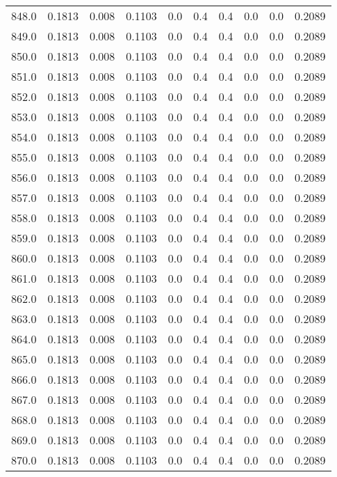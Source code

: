 \begin{longtable}{lrrrrrrrrr}
848.0 & 0.1813 & 0.008 & 0.1103 & 0.0 & 0.4 & 0.4 & 0.0 & 0.0 & 0.2089 \\
849.0 & 0.1813 & 0.008 & 0.1103 & 0.0 & 0.4 & 0.4 & 0.0 & 0.0 & 0.2089 \\
850.0 & 0.1813 & 0.008 & 0.1103 & 0.0 & 0.4 & 0.4 & 0.0 & 0.0 & 0.2089 \\
851.0 & 0.1813 & 0.008 & 0.1103 & 0.0 & 0.4 & 0.4 & 0.0 & 0.0 & 0.2089 \\
852.0 & 0.1813 & 0.008 & 0.1103 & 0.0 & 0.4 & 0.4 & 0.0 & 0.0 & 0.2089 \\
853.0 & 0.1813 & 0.008 & 0.1103 & 0.0 & 0.4 & 0.4 & 0.0 & 0.0 & 0.2089 \\
854.0 & 0.1813 & 0.008 & 0.1103 & 0.0 & 0.4 & 0.4 & 0.0 & 0.0 & 0.2089 \\
855.0 & 0.1813 & 0.008 & 0.1103 & 0.0 & 0.4 & 0.4 & 0.0 & 0.0 & 0.2089 \\
856.0 & 0.1813 & 0.008 & 0.1103 & 0.0 & 0.4 & 0.4 & 0.0 & 0.0 & 0.2089 \\
857.0 & 0.1813 & 0.008 & 0.1103 & 0.0 & 0.4 & 0.4 & 0.0 & 0.0 & 0.2089 \\
858.0 & 0.1813 & 0.008 & 0.1103 & 0.0 & 0.4 & 0.4 & 0.0 & 0.0 & 0.2089 \\
859.0 & 0.1813 & 0.008 & 0.1103 & 0.0 & 0.4 & 0.4 & 0.0 & 0.0 & 0.2089 \\
860.0 & 0.1813 & 0.008 & 0.1103 & 0.0 & 0.4 & 0.4 & 0.0 & 0.0 & 0.2089 \\
861.0 & 0.1813 & 0.008 & 0.1103 & 0.0 & 0.4 & 0.4 & 0.0 & 0.0 & 0.2089 \\
862.0 & 0.1813 & 0.008 & 0.1103 & 0.0 & 0.4 & 0.4 & 0.0 & 0.0 & 0.2089 \\
863.0 & 0.1813 & 0.008 & 0.1103 & 0.0 & 0.4 & 0.4 & 0.0 & 0.0 & 0.2089 \\
864.0 & 0.1813 & 0.008 & 0.1103 & 0.0 & 0.4 & 0.4 & 0.0 & 0.0 & 0.2089 \\
865.0 & 0.1813 & 0.008 & 0.1103 & 0.0 & 0.4 & 0.4 & 0.0 & 0.0 & 0.2089 \\
866.0 & 0.1813 & 0.008 & 0.1103 & 0.0 & 0.4 & 0.4 & 0.0 & 0.0 & 0.2089 \\
867.0 & 0.1813 & 0.008 & 0.1103 & 0.0 & 0.4 & 0.4 & 0.0 & 0.0 & 0.2089 \\
868.0 & 0.1813 & 0.008 & 0.1103 & 0.0 & 0.4 & 0.4 & 0.0 & 0.0 & 0.2089 \\
869.0 & 0.1813 & 0.008 & 0.1103 & 0.0 & 0.4 & 0.4 & 0.0 & 0.0 & 0.2089 \\
870.0 & 0.1813 & 0.008 & 0.1103 & 0.0 & 0.4 & 0.4 & 0.0 & 0.0 & 0.2089 \\

\end{longtable}
